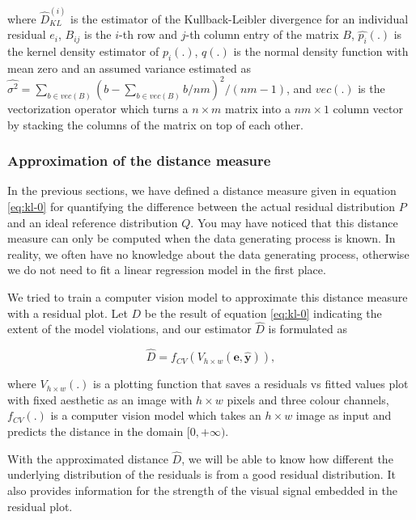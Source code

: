 \documentclass[]{interact}
\theoremstyle{plain}%
\theoremstyle{definition}
\theoremstyle{remark}
\begin{document}
\noindent where \(\hat{D}_{KL}^{(i)}\) is the estimator of the
Kullback-Leibler divergence for an individual residual \(e_i\),
\(B_{ij}\) is the \(i\)-th row and \(j\)-th column entry of the matrix
\(B\), \(\hat{p_i}(.)\) is the kernel density estimator of \(p_i(.)\),
\(q(.)\) is the normal density function with mean zero and an assumed
variance estimated as
\(\widehat{\sigma^2} = \sum_{b \in vec(B)}(b - \sum_{b \in vec(B)} b/nm)^2/(nm - 1)\),
and \(vec(.)\) is the vectorization operator which turns a
\(n \times m\) matrix into a \(nm \times 1\) column vector by stacking
the columns of the matrix on top of each other.

\hypertarget{approximation-of-the-distance-measure}{%
\subsubsection{Approximation of the distance
measure}\label{approximation-of-the-distance-measure}}

In the previous sections, we have defined a distance measure given in
equation \ref{eq:kl-0} for quantifying the difference between the actual
residual distribution \(P\) and an ideal reference distribution \(Q\).
You may have noticed that this distance measure can only be computed
when the data generating process is known. In reality, we often have no
knowledge about the data generating process, otherwise we do not need to
fit a linear regression model in the first place.

We tried to train a computer vision model to approximate this distance
measure with a residual plot. Let \(D\) be the result of equation
\ref{eq:kl-0} indicating the extent of the model violations, and our
estimator \(\hat{D}\) is formulated as

\begin{equation}
\label{eq:d-approx}
\hat{D} = f_{CV}(V_{h \times w}(\boldsymbol{e}, \hat{\boldsymbol{y}})),
\end{equation}

\noindent where \(V_{h \times w}(.)\) is a plotting function that saves
a residuals vs fitted values plot with fixed aesthetic as an image with
\(h \times w\) pixels and three colour channels, \(f_{CV}(.)\) is a
computer vision model which takes an \(h \times w\) image as input and
predicts the distance in the domain \([0, +\infty)\).

With the approximated distance \(\hat{D}\), we will be able to know how
different the underlying distribution of the residuals is from a good
residual distribution. It also provides information for the strength of
the visual signal embedded in the residual plot.
\end{document}
